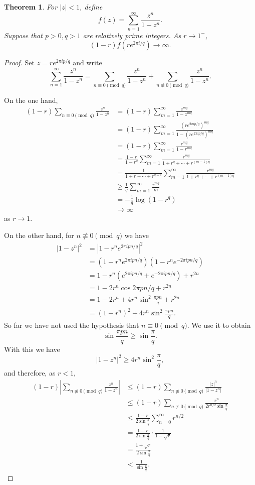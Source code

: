 \documentclass{article}
\newtheorem{theorem}{Theorem}
\begin{document}
\begin{theorem}
For $|z|<1$, define
\[
f(z) = \sum_{n=1}^\infty \frac{z^n}{1-z^n}.
\]
Suppose that $p>0, q>1$ are relatively prime integers.
As $r \to 1^-$,
\[
(1-r) f(r e^{2\pi i/q}) \to \infty.
\]  
\end{theorem}
\begin{proof}
Set $z=re^{2\pi i p/q}$ and write
\[
\sum_{n=1}^\infty \frac{z^n}{1-z^n} =
\sum_{n \equiv 0 \pmod{q}}   \frac{z^n}{1-z^n}
+ \sum_{n \not \equiv 0 \pmod{q}}  \frac{z^n}{1-z^n}.
\]

On the one hand, 
\begin{align*}
(1-r) \sum_{n \equiv 0 \pmod{q}}   \frac{z^n}{1-z^n}&=
(1-r) \sum_{m=1}^\infty \frac{z^{mq}}{1-z^{mq}}\\
&=(1-r) \sum_{m=1}^\infty \frac{(re^{2\pi i p/q})^{mq}}{1-(re^{2\pi i p/q})^{mq}}\\
&=(1-r) \sum_{m=1}^\infty \frac{r^{mq}}{1-r^{mq}}\\
&=\frac{1-r}{1-r^q} \sum_{m=1}^\infty \frac{r^{mq}}{1+r^q+\cdots+r^{(m-1)q}}\\
&=\frac{1}{1+r+\cdots+r^{q-1}} \sum_{m=1}^\infty \frac{r^{mq}}{1+r^q+\cdots+r^{(m-1)q}}\\
&\geq \frac{1}{q} \sum_{m=1}^\infty \frac{r^{mq}}{m}\\
&=-\frac{1}{q} \log(1-r^q)\\
&\to \infty
\end{align*}
as $r \to 1$.

On the other hand, for $n \not \equiv 0 \pmod{q}$ we have
\begin{align*}
|1-z^n|^2 &= |1-r^n e^{2\pi ipn/q}|^2\\
& = (1-r^n e^{2\pi ipn/q})(1-r^n e^{-2\pi i pn/q})\\
&=1-r^n(e^{2\pi ipn/q}+e^{-2\pi ipn/q}) +r^{2n}\\
&=1-2r^n \cos 2\pi pn/q + r^{2n}\\
&=1-2r^n + 4r^n \sin^2 \frac{\pi pn}{q} + r^{2n}\\
&= (1-r^n)^2 + 4r^n \sin^2 \frac{\pi pn}{q}.
\end{align*}
So far we have not used the hypothesis that $n \equiv 0 \pmod{q}$. We use it to obtain
\[
\sin \frac{\pi pn}{q} \geq \sin \frac{\pi}{q}.
\]
With this we have
\[
|1-z^n|^2 \geq 4r^n \sin^2 \frac{\pi}{q},
\]
and therefore, as $r<1$,
\begin{align*}
(1-r) \left| \sum_{n \not \equiv 0 \pmod{q}} \frac{z^n}{1-z^n} \right|&\leq
(1-r) \sum_{n \not \equiv 0 \pmod{q}} \frac{|z|^n}{|1-z^n|}\\
&\leq (1-r) \sum_{n \not \equiv 0 \pmod{q}} \frac{r^n}{2r^{n/2} \sin \frac{\pi}{q}}\\
&\leq \frac{1-r}{2 \sin \frac{\pi}{q}}  \sum_{n=0}^\infty r^{n/2}\\
&=\frac{1-r}{2 \sin \frac{\pi}{q}} \cdot \frac{1}{1-\sqrt{r}}\\
&=\frac{1+\sqrt{r}}{2\sin \frac{\pi}{q}}\\
&<\frac{1}{\sin \frac{\pi}{q}}.
\end{align*}
\end{proof}
\end{document}
